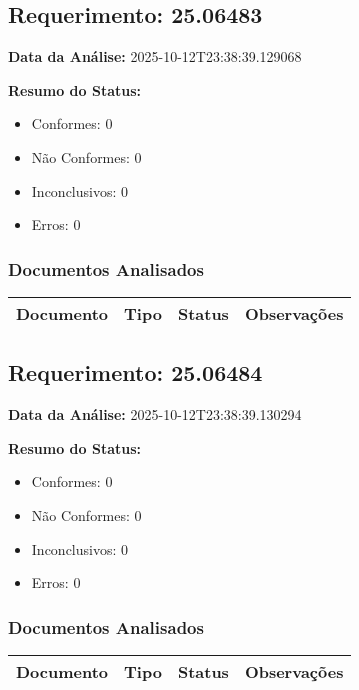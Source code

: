 \documentclass[12pt,a4paper]{article}
\begin{document}
\subsection{Requerimento: 25.06483}

\textbf{Data da Análise:} 2025-10-12T23:38:39.129068

\textbf{Resumo do Status:}
\begin{itemize}
    \item Conformes: 0
    \item Não Conformes: 0
    \item Inconclusivos: 0
    \item Erros: 0
\end{itemize}

\subsubsection{Documentos Analisados}

\begin{longtable}{|p{4cm}|p{2cm}|p{2cm}|p{6cm}|}
\hline
\textbf{Documento} & \textbf{Tipo} & \textbf{Status} & \textbf{Observações} \\
\hline
\endhead
\end{longtable}


\subsection{Requerimento: 25.06484}

\textbf{Data da Análise:} 2025-10-12T23:38:39.130294

\textbf{Resumo do Status:}
\begin{itemize}
    \item Conformes: 0
    \item Não Conformes: 0
    \item Inconclusivos: 0
    \item Erros: 0
\end{itemize}

\subsubsection{Documentos Analisados}

\begin{longtable}{|p{4cm}|p{2cm}|p{2cm}|p{6cm}|}
\hline
\textbf{Documento} & \textbf{Tipo} & \textbf{Status} & \textbf{Observações} \\
\hline
\endhead
\end{longtable}
\end{document}
